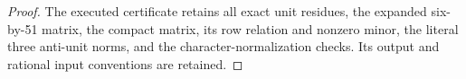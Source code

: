 \begin{proof}
The executed certificate
retains all exact unit residues, the expanded six-by-51 matrix,
the compact matrix, its row relation and nonzero minor, the
literal three anti-unit norms, and the character-normalization
checks.  Its output and rational input conventions are retained.
\end{proof}
